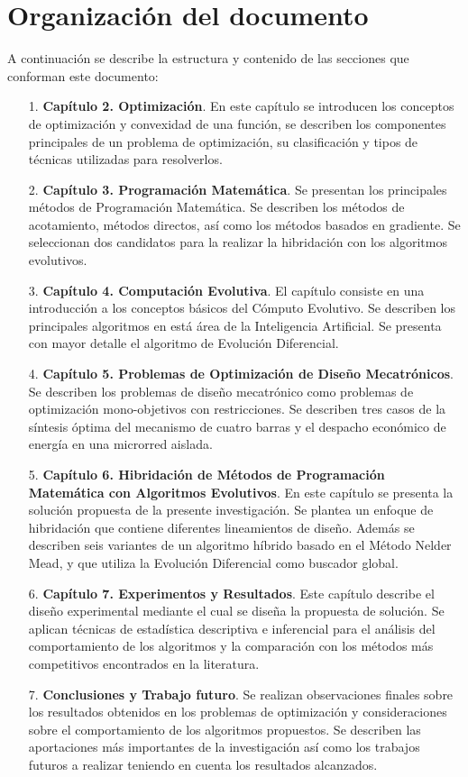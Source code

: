  \section{Organización del documento}
A continuación se describe la estructura y contenido de las secciones que conforman este documento:
  \begin{itemize}
	\item[1.]\textbf{Capítulo 2. Optimización}. En este capítulo se introducen los conceptos de
optimización y convexidad de una función, se describen los componentes principales de un problema de
optimización, su clasificación y tipos de técnicas utilizadas para
resolverlos. 
\item[2.]\textbf{Capítulo 3. Programación Matemática}. Se presentan los principales métodos de Programación Matemática. Se describen los métodos de acotamiento, métodos directos, así como los métodos basados en gradiente. Se seleccionan dos candidatos para la realizar la hibridación con los algoritmos evolutivos.
	\item[3.]\textbf{Capítulo 4. Computación Evolutiva}. El capítulo consiste en una introducción a los conceptos básicos del Cómputo Evolutivo. Se describen los principales algoritmos en está área de la Inteligencia Artificial. Se presenta con mayor detalle el algoritmo de Evolución Diferencial.
	\item[4.]\textbf{Capítulo 5. Problemas de Optimización de Diseño Mecatrónicos}. Se describen los problemas de diseño mecatrónico como problemas de optimización mono-objetivos con restricciones. Se describen tres casos de la síntesis óptima del mecanismo de cuatro barras y el despacho económico de energía en una
microrred aislada. 
	\item[5.]\textbf{Capítulo 6. Hibridación de Métodos de Programación Matemática con Algoritmos Evolutivos}. En este capítulo  se presenta la solución propuesta de la presente investigación. Se plantea un enfoque de hibridación que contiene diferentes lineamientos de diseño. Además se describen seis variantes de un algoritmo híbrido basado en el Método Nelder Mead, y que utiliza la Evolución Diferencial como buscador global. 
	\item[6.]\textbf{Capítulo 7. Experimentos y Resultados}. Este capítulo describe el diseño experimental mediante el cual se diseña la propuesta de solución. Se aplican técnicas de estadística descriptiva e inferencial para el análisis del comportamiento de los algoritmos y la comparación con los métodos más competitivos encontrados en la literatura.
\item[7.] \textbf{Conclusiones y Trabajo futuro}. Se realizan observaciones finales sobre los resultados obtenidos en los problemas de optimización y consideraciones sobre el comportamiento de los algoritmos propuestos. Se describen las aportaciones más importantes de la investigación así como los trabajos futuros a realizar teniendo en cuenta los resultados alcanzados.

  \end{itemize}
